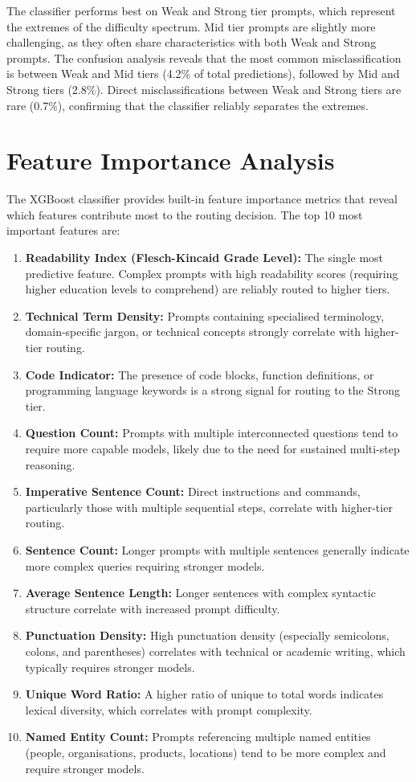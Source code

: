 \documentclass[oneside,12pt,a4paper]{report}
\begin{document}
The classifier performs best on Weak and Strong tier prompts, which represent the extremes of the difficulty spectrum. Mid tier prompts are slightly more challenging, as they often share characteristics with both Weak and Strong prompts. The confusion analysis reveals that the most common misclassification is between Weak and Mid tiers (4.2\% of total predictions), followed by Mid and Strong tiers (2.8\%). Direct misclassifications between Weak and Strong tiers are rare (0.7\%), confirming that the classifier reliably separates the extremes.

\section{Feature Importance Analysis}

The XGBoost classifier provides built-in feature importance metrics that reveal which features contribute most to the routing decision. The top 10 most important features are:

\begin{enumerate}
  \item \textbf{Readability Index (Flesch-Kincaid Grade Level):} The single most predictive feature. Complex prompts with high readability scores (requiring higher education levels to comprehend) are reliably routed to higher tiers.
  \item \textbf{Technical Term Density:} Prompts containing specialised terminology, domain-specific jargon, or technical concepts strongly correlate with higher-tier routing.
  \item \textbf{Code Indicator:} The presence of code blocks, function definitions, or programming language keywords is a strong signal for routing to the Strong tier.
  \item \textbf{Question Count:} Prompts with multiple interconnected questions tend to require more capable models, likely due to the need for sustained multi-step reasoning.
  \item \textbf{Imperative Sentence Count:} Direct instructions and commands, particularly those with multiple sequential steps, correlate with higher-tier routing.
  \item \textbf{Sentence Count:} Longer prompts with multiple sentences generally indicate more complex queries requiring stronger models.
  \item \textbf{Average Sentence Length:} Longer sentences with complex syntactic structure correlate with increased prompt difficulty.
  \item \textbf{Punctuation Density:} High punctuation density (especially semicolons, colons, and parentheses) correlates with technical or academic writing, which typically requires stronger models.
  \item \textbf{Unique Word Ratio:} A higher ratio of unique to total words indicates lexical diversity, which correlates with prompt complexity.
  \item \textbf{Named Entity Count:} Prompts referencing multiple named entities (people, organisations, products, locations) tend to be more complex and require stronger models.
\end{enumerate}
\end{document}
